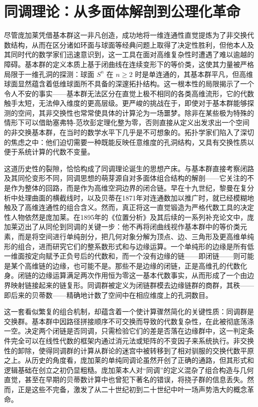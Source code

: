 \documentclass[12pt,a4paper]{article}
\begin{document}
\section{同调理论：从多面体解剖到公理化革命}

尽管庞加莱凭借基本群这一非凡创造，成功地将一维连通性直觉提炼为了非交换代数结构，从而在区分诸如环面与球面等经典问题上取得了决定性胜利，但他本人及其同时代的数学家们迅速意识到，这一工具在面对高维复杂性时遭遇了难以逾越的障碍。基本群的定义本质上基于闭曲线在连续变形下的等价类，这使其力量被严格局限于一维孔洞的探测：球面 $S^n$ 在 $n \ge 2$ 时是单连通的，其基本群平凡，但高维球面显然蕴含着低维球面所不具备的深邃拓扑结构。这一根本性的局限揭示了一个令人不安的事实——基本群无法区分在直觉上极不相同的各类高维流形，它的代数触手太短，无法伸入维度的更高层级。更严峻的挑战在于，即使对于基本群能够探测的空间，其非交换性也常常使具体的计算沦为一场噩梦。除非在某些极为特殊的情形下可以借助塞弗特-范坎彭定理化整为零，否则直接从定义出发求出一个空间的非交换基本群，在当时的数学水平下几乎是不可想象的。拓扑学家们陷入了深切的焦虑之中：他们迫切需要一种既能反映任意维度的孔洞结构，又具有交换性质以便于系统计算的代数不变量。

这道历史性的裂隙，恰恰构成了同调理论诞生的思想产床。与基本群直接考察闭路及其同伦变形不同，同调思想的萌芽源自对多面体组合结构的解剖——它关注的不是作为整体的回路，而是作为高维空洞边界的闭合链。早在十九世纪，黎曼在复分析中处理曲面的横截线时，以及贝蒂在1871年对连通数加以推广时，就已经模糊地触及了高维连通性的组合含义。然而，真正将这一直觉锻造为严格代数工具的决定性人物依然是庞加莱。在1895年的《位置分析》及其后续的一系列补充论文中，庞加莱迈出了从同伦到同调的关键一步：他不再将闭曲线视作基本群中的等价类元素，而是将空间进行单纯剖分，把几何对象分解为顶点、边、三角形及更高维单纯形的组合，进而研究它们的整系数形式和与边缘运算。一个单纯形的边缘是所有低一维面按定向赋予正负号后的代数和，而一个没有边缘的链——即闭链——则可能是某个高维链的边缘，也可能不是。那些不是边缘的闭链，正是高维孔的代数化身。闭链的边缘运算满足两次作用恒为零这一基本代数事实，从而形成了一个由边界映射链接起来的链复形。同调群被定义为闭链群模去边缘链群的商群，其秩——即后来的贝蒂数——精确地计数了空间中在相应维度上的孔洞数目。

这一套看似繁复的组合机制，却蕴含着一个使计算骤然简化的关键性质：同调群是交换群。基本群中因路径拼接顺序不可交换而导致的代数复杂性，在此被彻底荡涤一空。决定两个闭链是否同调，只需检验它们的差是否落在边缘群中，这一判定条件完全可以在线性代数的框架内通过消元法或矩阵的不变因子来系统执行。非交换性的卸除，使得同调群的计算从群论的迷宫中被转移到了相对驯服的交换代数平原之上。从历史的角度看，庞加莱的单纯同调论虽然开创了正确的通路，但其形式和逻辑基础在创立之初仍显粗糙。庞加莱本人对“同调”的定义混杂了组合构造与几何直觉，甚至在早期的贝蒂数计算中也曾犯下著名的错误，将挠子群的信息丢失。然而，正是这些不完备，激发了从二十世纪初到二十世纪中叶一场声势浩大的概念革命。
\end{document}
